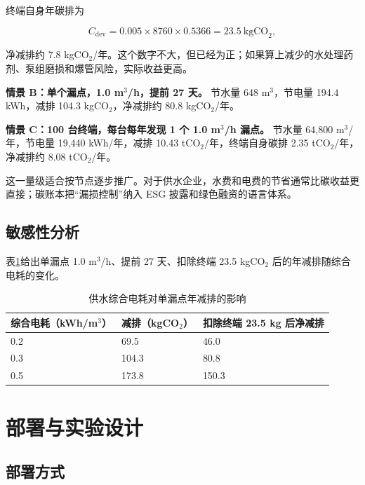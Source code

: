 \documentclass[UTF8,11pt,a4paper,fontset=none]{ctexart}
\begin{document}
终端自身年碳排为

\begin{equation}
  C_{\text{dev}} = 0.005 \times 8760 \times 0.5366 = 23.5\ \text{kgCO}_2,
\end{equation}

净减排约 7.8 kgCO\(_2\)/年。这个数字不大，但已经为正；如果算上减少的水处理药剂、泵组磨损和爆管风险，实际收益更高。

\textbf{情景 B：单个漏点，1.0 m\(^3\)/h，提前 27 天。} 节水量 648 m\(^3\)，节电量 194.4 kWh，减排 104.3 kgCO\(_2\)，净减排约 80.8 kgCO\(_2\)/年。

\textbf{情景 C：100 台终端，每台每年发现 1 个 1.0 m\(^3\)/h 漏点。} 节水量 64,800 m\(^3\)/年，节电量 19,440 kWh/年，减排 10.43 tCO\(_2\)/年，终端自身碳排 2.35 tCO\(_2\)/年，净减排约 8.08 tCO\(_2\)/年。

这一量级适合按节点逐步推广。对于供水企业，水费和电费的节省通常比碳收益更直接；碳账本把“漏损控制”纳入 ESG 披露和绿色融资的语言体系。

\subsection{敏感性分析}

表\ref{tab:sensitivity}给出单漏点 1.0 m\(^3\)/h、提前 27 天、扣除终端 23.5 kgCO\(_2\) 后的年减排随综合电耗的变化。

\begin{table}[H]
\centering
\small
\caption{供水综合电耗对单漏点年减排的影响}
\label{tab:sensitivity}
\begin{tabular}{p{4.2cm}p{4.6cm}p{4.6cm}}
\toprule
综合电耗（kWh/m\(^3\)） & 减排（kgCO\(_2\)） & 扣除终端 23.5 kg 后净减排 \\
\midrule
0.2 & 69.5 & 46.0 \\
0.3 & 104.3 & 80.8 \\
0.5 & 173.8 & 150.3 \\
\bottomrule
\end{tabular}
\end{table}

\section{部署与实验设计}
\label{sec:evaluation}

\subsection{部署方式}
\end{document}

